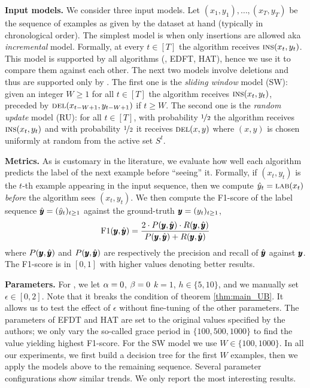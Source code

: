 \noindent\textbf{Input models.} We consider three input models. Let $(x_1,y_1), \dots ,(x_T,y_T)$ be the sequence of examples as given by the dataset at hand (typically in chronological order). The simplest model is when only insertions are allowed aka \emph{incremental} model. %
Formally, at every $t \in [T]$ the algorithm receives $\textsc{ins}(x_t,y_t)$. This model is supported by all algorithms (\algo, EDFT, HAT), hence we use it to compare them against each other.
The next two models involve deletions and thus are supported only by \algo. The first one is the \emph{sliding window} model (SW): given an integer $W \ge 1$ for all $t \in [T]$ the algorithm receives $\textsc{ins}(x_t,y_t)$, preceded by $\textsc{del}(x_{t-W+1},y_{t-W+1})$ if $t \ge W$. The second one is the \emph{random update} model (RU): for all $t \in [T]$, with probability $\nicefrac12$ the algorithm receives $\textsc{ins}(x_t,y_t)$ and with probability $\nicefrac12$ it receives $\textsc{del}(x,y)$ where $(x,y)$ is chosen uniformly at random from the active set $S^t$. %

\noindent\textbf{Metrics.} As is customary in the literature, we evaluate how well each algorithm predicts the label of the next example before ``seeing'' it. Formally, if $(x_t,y_t)$ is the $t$-th example appearing in the input sequence, then we compute $\hat y_t = \textsc{lab}(x_t)$ \emph{before} the algorithm sees $(x_t,y_t)$. We then compute the F1-score of the label sequence $\hat{\pmb{y}}=(\hat y_t)_{t \ge 1}$ against the ground-truth $\pmb{y}=(y_t)_{t \ge 1}$,
\begin{align}
    \text{F1}(\pmb{y},\hat{\pmb{y}}) = \frac{2 \cdot P(\pmb{y},\hat{\pmb{y}})\cdot R(\pmb{y},\hat{\pmb{y}})}{P(\pmb{y},\hat{\pmb{y}})+R(\pmb{y},\hat{\pmb{y}})}
\end{align}
where $P(\pmb{y},\hat{\pmb{y}})$ and $P(\pmb{y},\hat{\pmb{y}})$ are respectively the precision and recall of $\hat{\pmb{y}}$ against $\pmb{y}$. The F1-score is in $[0,1]$ with higher values denoting better results.  

\noindent\textbf{Parameters.} 
For \algo, we let $\alpha = 0$, $\beta = 0$ $k = 1$, $h \in \{5,10\}$, and we manually set $\epsilon \in [0,2]$. Note that it breaks the condition of theorem \ref{thm:main_UB}. It allows us to test the effect of $\epsilon$ without fine-tuning of the other parameters.
The parameters of EFDT and HAT are set to the original values specified by the authors; we only vary the so-called grace period in $\{100, 500, 1000\}$ to find the value yielding highest F1-score. For the SW model we use $W\in\{100,1000\}$.  In all our experiments, we first build a decision tree for the first $W$ examples, then we apply the models above to the remaining sequence. Several parameter configurations show similar trends. We only report the most interesting results.%

